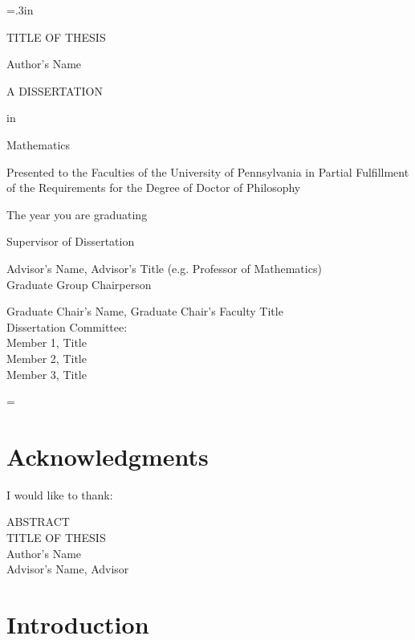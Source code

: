 \documentclass[12pt]{report}
\newcommand{\doublespaced}{\renewcommand{\baselinestretch}{2}\normalfont}
\newcommand{\singlespaced}{\renewcommand{\baselinestretch}{1}\normalfont}
\newcommand{\draftspaced}{\doublespaced} %
\theoremstyle{definition}
\theoremstyle{remark}
\numberwithin{equation}{section}
\def\thetitle{TITLE OF THESIS}
\def\theauthor{Author's Name}
\def\theadvisor{Advisor's Name, Advisor}
\def\theyear{The year you are graduating}
\begin{document}
\large\newlength{\oldparskip}\setlength\oldparskip{\parskip}\parskip=.3in
\thispagestyle{empty}
\begin{center}
\thetitle

\theauthor


A DISSERTATION

in

Mathematics
\end{center}


\noindent\singlespaced\large
Presented to the Faculties of the University of Pennsylvania in Partial
Fulfillment of the Requirements for the Degree of Doctor of Philosophy


\begin{center}
\theyear
\end{center}

\noindent Supervisor of Dissertation

\bigskip
\noindent\makebox[-0.06in][l]{\rule[2ex]{3in}{.3mm}}
\singlespaced
Advisor's Name, Advisor's Title (e.g. Professor of Mathematics)\\

\noindent Graduate Group Chairperson

\bigskip
\noindent\makebox[-0.06in][l]{\rule[2ex]{3in}{.3mm}}
\singlespaced
Graduate Chair's Name, Graduate Chair's Faculty Title\\


\noindent
\singlespaced
Dissertation Committee:\\
Member 1, Title\\
Member 2, Title\\
Member 3, Title
\vspace*{\fill}

\normalsize\parskip=\oldparskip


\newpage
\doublespaced

\chapter*{Acknowledgments}
I would like to thank:

\newpage
\begin{center}
  ABSTRACT\\
\thetitle\\
\vspace{.5in}
  \theauthor\\
  \theadvisor
\end{center}

\doublespaced
\noindent


\vspace*{\fill}

\newpage

\tableofcontents

\newpage
\draftspaced
{}

\chapter{Introduction}





\begin{thebibliography}{99}

\end{thebibliography}
\end{document}
